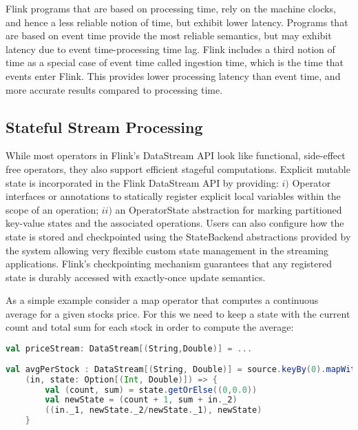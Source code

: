 Flink programs that are based on processing time, rely on the machine clocks, and hence a less reliable notion of time, but exhibit lower latency. Programs that are based on event time provide the most reliable semantics, but may exhibit latency due to event time-processing time lag. Flink includes a third notion of time as a special case of event time called ingestion time, which is the time that events enter Flink. This provides  lower processing latency than event time, and more accurate results compared to processing time.


\subsection{Stateful Stream Processing}

While most operators in Flink’s DataStream API look like functional, side-effect free operators, they also support efficient stageful computations. Explicit mutable state is incorporated in the Flink DataStream API by providing: $i)$ Operator interfaces or annotations to statically register explicit local variables within the scope of an operation;  $ii)$ an OperatorState abstraction for marking partitioned key-value states and the associated operations. Users can also configure how the state is stored and checkpointed using the StateBackend abstractions provided by the system allowing very flexible custom state management in the streaming applications. Flink’s checkpointing mechanism guarantees that any registered state is durably accessed with exactly-once update semantics. 

As a simple example consider a map operator that computes a continuous average for a given stocks price. For this we need to keep a state with the current count and total sum for each stock in order to compute the average:


\begin{lstlisting}[language=Scala]
val priceStream: DataStream[(String,Double)] = ...
 
val avgPerStock : DataStream[(String, Double)] = source.keyBy(0).mapWithState(
    (in, state: Option[(Int, Double)]) => {
		val (count, sum) = state.getOrElse((0,0.0))
		val newState = (count + 1, sum + in._2)
		((in._1, newState._2/newState._1), newState)
	}
\end{lstlisting}

